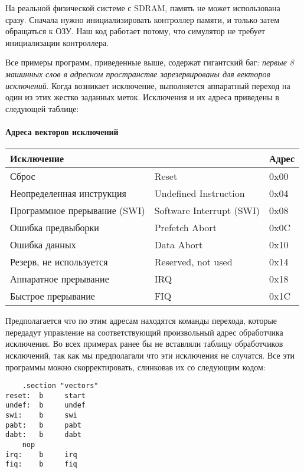 \begin{framed}
На реальной физической системе с SDRAM, память не может использована 
сразу. Сначала нужно инициализировать контроллер памяти, и только затем
обращаться к ОЗУ. Наш код работает потому, что симулятор не требует
инициализации контроллера.
\end{framed}

\secup


Все примеры программ, приведенные выше, содержат гигантский баг: \emph{первые
8 машинных слов в адресном пространстве зарезервированы для векторов
исключений}. Когда возникает исключение, выполняется аппаратный переход
на один из этих жестко заданных меток. Исключения и их адреса приведены
в следующей таблице:

\paragraph{Адреса векторов исключений\\}

\begin{tabular}{l l l}
Исключение && Адрес \\
\hline
 Сброс & Reset                   & 0x00 \\
 Неопределенная инструкция & Undefined Instruction	  & 0x04 \\
 Программное прерывание (SWI) & Software Interrupt (SWI)& 0x08 \\
 Ошибка предвыборки & Prefetch Abort	  & 0x0C \\
 Ошибка данных & Data Abort		  & 0x10 \\
 Резерв, не используется & Reserved, not used	  & 0x14 \\
 Аппаратное прерывание & IRQ			  & 0x18 \\
 Быстрое прерывание & FIQ			  & 0x1C \\
\end{tabular}

Предполагается что по этим адресам находятся команды перехода, которые
передадут управление на соответствующий произвольный адрес обработчика
исключения. Во всех примерах ранее бы не вставляли таблицу обработчиков
исключений, так как мы предполагали что эти исключения не случатся. Все
эти программы можно скорректировать, слинковав их со следующим кодом:  

\begin{verbatim}
	.section "vectors"
reset:	b     start
undef:  b     undef
swi:	b     swi
pabt:	b     pabt
dabt:	b     dabt
	nop
irq:	b     irq
fiq:	b     fiq
\end{verbatim}


